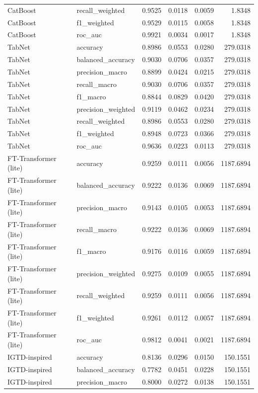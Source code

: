 \begin{tabular}{llrrrr}
CatBoost & recall_weighted & 0.9525 & 0.0118 & 0.0059 & 1.8348 \\
CatBoost & f1_weighted & 0.9529 & 0.0115 & 0.0058 & 1.8348 \\
CatBoost & roc_auc & 0.9921 & 0.0034 & 0.0017 & 1.8348 \\
TabNet & accuracy & 0.8986 & 0.0553 & 0.0280 & 279.0318 \\
TabNet & balanced_accuracy & 0.9030 & 0.0706 & 0.0357 & 279.0318 \\
TabNet & precision_macro & 0.8899 & 0.0424 & 0.0215 & 279.0318 \\
TabNet & recall_macro & 0.9030 & 0.0706 & 0.0357 & 279.0318 \\
TabNet & f1_macro & 0.8844 & 0.0829 & 0.0420 & 279.0318 \\
TabNet & precision_weighted & 0.9119 & 0.0462 & 0.0234 & 279.0318 \\
TabNet & recall_weighted & 0.8986 & 0.0553 & 0.0280 & 279.0318 \\
TabNet & f1_weighted & 0.8948 & 0.0723 & 0.0366 & 279.0318 \\
TabNet & roc_auc & 0.9636 & 0.0223 & 0.0113 & 279.0318 \\
FT-Transformer (lite) & accuracy & 0.9259 & 0.0111 & 0.0056 & 1187.6894 \\
FT-Transformer (lite) & balanced_accuracy & 0.9222 & 0.0136 & 0.0069 & 1187.6894 \\
FT-Transformer (lite) & precision_macro & 0.9143 & 0.0105 & 0.0053 & 1187.6894 \\
FT-Transformer (lite) & recall_macro & 0.9222 & 0.0136 & 0.0069 & 1187.6894 \\
FT-Transformer (lite) & f1_macro & 0.9176 & 0.0116 & 0.0059 & 1187.6894 \\
FT-Transformer (lite) & precision_weighted & 0.9275 & 0.0109 & 0.0055 & 1187.6894 \\
FT-Transformer (lite) & recall_weighted & 0.9259 & 0.0111 & 0.0056 & 1187.6894 \\
FT-Transformer (lite) & f1_weighted & 0.9261 & 0.0112 & 0.0057 & 1187.6894 \\
FT-Transformer (lite) & roc_auc & 0.9812 & 0.0041 & 0.0021 & 1187.6894 \\
IGTD-inspired & accuracy & 0.8136 & 0.0296 & 0.0150 & 150.1551 \\
IGTD-inspired & balanced_accuracy & 0.7782 & 0.0451 & 0.0228 & 150.1551 \\
IGTD-inspired & precision_macro & 0.8000 & 0.0272 & 0.0138 & 150.1551 \\

\end{tabular}

